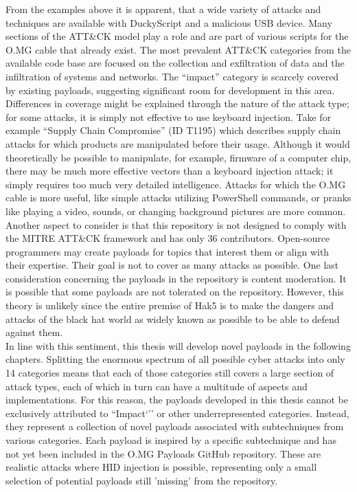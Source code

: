 From the examples above it is apparent, that a wide variety of attacks and techniques are available with DuckyScript and a malicious USB device. Many sections of the ATT\&CK model play a role and are part of various scripts for the O.MG cable that already exist. The most prevalent ATT\&CK categories from the available code base are focused on the collection and exfiltration of data and the infiltration of systems and networks. The ``impact'' category is scarcely covered by existing payloads, suggesting significant room for development in this area.
Differences in coverage might be explained through the nature of the attack type; for some attacks, it is simply not effective to use keyboard injection. Take for example ``Supply Chain Compromise'' (ID T1195) \cite{SupplyChainCompromise} which describes supply chain attacks for which products are manipulated before their usage. Although it would theoretically be possible to manipulate, for example, firmware of a computer chip, there may be much more effective vectors than a keyboard injection attack; it simply requires too much very detailed intelligence. Attacks for which the O.MG cable is more useful, like simple attacks utilizing PowerShell commands, or pranks like playing a video, sounds, or changing background pictures are more common. 
Another aspect to consider is that this repository is not designed to comply with the MITRE ATT\&CK framework and has only 36 contributors. Open-source programmers may create payloads for topics that interest them or align with their expertise. Their goal is not to cover as many attacks as possible. One last consideration concerning the payloads in the repository is content moderation. It is possible that some payloads are not tolerated on the repository. However, this theory is unlikely since the entire premise of Hak5 is to make the dangers and attacks of the black hat world as widely known as possible to be able to defend against them.\\  
In line with this sentiment, this thesis will develop novel payloads in the following chapters. Splitting the enormous spectrum of all possible cyber attacks into only 14 categories means that each of those categories still covers a large section of attack types, each of which in turn can have a multitude of aspects and implementations. For this reason, the payloads developed in this thesis cannot be exclusively attributed to ``Impact`'' or other underrepresented categories. Instead, they represent a collection of novel payloads associated with subtechniques from various categories. Each payload is inspired by a specific subtechnique and has not yet been included in the O.MG Payloads GitHub repository. These are realistic attacks where HID injection is possible, representing only a small selection of potential payloads still 'missing' from the repository.

